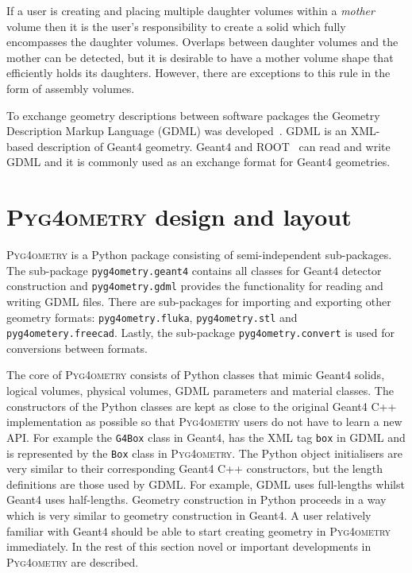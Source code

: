 \documentclass[final,5p,times,twocolumn]{elsarticle}
\newcommand{\pyinline}[1]{\lstinline[postbreak={}]{#1}}
\newcommand{\PYGEOMETRY}{\textsc{Pyg4ometry}}
\begin{document}
If a user is creating and placing multiple daughter volumes within a \emph{mother} volume then it is the user's responsibility to create a solid which fully
encompasses the daughter volumes. Overlaps between daughter volumes and the mother can be detected, but it is desirable
to have a mother volume shape that efficiently holds its daughters. However, there are exceptions to this rule in the form of assembly volumes.


To exchange geometry descriptions between software packages the Geometry Description Markup Language (GDML) was developed~\cite{GDML}.
GDML is an XML-based description of Geant4 geometry. Geant4 and ROOT~\cite{fons_rademakers_2019_3895860} can read and write
GDML and it is commonly used as an exchange format for Geant4 geometries.

\section{\PYGEOMETRY{} design and layout}
\PYGEOMETRY{} is a Python package consisting of semi-independent sub-packages. The sub-package \verb|pyg4ometry.geant4| contains all classes for
Geant4 detector construction and \verb|pyg4ometry.gdml| provides the functionality for reading and writing GDML files. There are sub-packages for importing and
exporting other geometry formats: \verb|pyg4ometry.fluka|, \verb|pyg4ometry.stl| and \verb|pyg4ometery.freecad|.  Lastly, the sub-package \verb|pyg4ometry.convert|
is used for conversions between formats.

The core of \PYGEOMETRY{} consists of Python classes that mimic Geant4 solids, logical volumes, physical volumes, GDML parameters and material classes.
The constructors of the Python classes are kept as close to the original Geant4 C++ implementation as possible so that \PYGEOMETRY{} users do not have to learn
a new API. For example the \verb|G4Box| class in Geant4, has the XML tag \verb|box| in GDML and is represented by the \pyinline{Box}
class in \PYGEOMETRY{}. The Python object initialisers are very similar to their corresponding Geant4 C++ constructors, but the length definitions are those used by GDML. For example,
GDML uses full-lengths whilst Geant4 uses half-lengths. Geometry construction in Python proceeds in a way which is very similar to geometry construction in Geant4.
A user relatively familiar with Geant4 should be able to start creating geometry in \PYGEOMETRY{} immediately. In the rest of this section novel or important developments
in \PYGEOMETRY{} are described.
\end{document}
